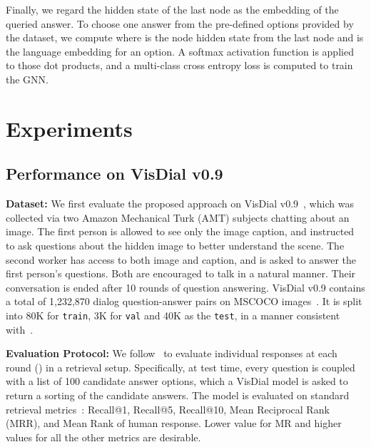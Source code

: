 \documentclass[10pt,twocolumn,letterpaper]{article}
\begin{document}
Finally, we regard the hidden state of the last node as the embedding of the queried answer. To choose one answer from the pre-defined options provided by the dataset, we compute  where  is the node hidden state from the last node and  is the language embedding for an option. A softmax activation function is applied to those dot products, and a multi-class cross entropy loss is computed to train the GNN.

\section{Experiments}\label{sec:ex}
\vspace{-3pt}
\subsection{Performance on VisDial v0.9~\cite{das2017visual}}\label{sec:vd}
\vspace{-3pt}
\noindent\textbf{Dataset:} We first evaluate the proposed approach on VisDial v0.9~\cite{das2017visual}, which was collected via two Amazon Mechanical Turk (AMT) subjects chatting about an image. The first person is allowed to see only the image caption, and instructed to ask questions about the hidden image to better understand the scene.  The second worker has access to both image and caption, and is asked to answer the first person's questions. Both are encouraged to talk in a natural manner. Their conversation is ended after 10 rounds of question answering. VisDial v0.9 contains a total of 1,232,870 dialog question-answer pairs on MSCOCO images~\cite{lin2014microsoft}. It is split into 80K for \verb"train", 3K  for \verb"val" and 40K as the \verb"test", in a manner consistent with~\cite{das2017visual}.

\noindent\textbf{Evaluation Protocol:} We follow~\cite{das2017visual} to evaluate individual responses at each round () in a retrieval setup. Specifically, at test time, every question is coupled with a list of 100 candidate answer options, which a VisDial model is asked to return a sorting of the candidate answers. The model is
evaluated on standard retrieval metrics~\cite{das2017visual}:  Recall@1, Recall@5, Recall@10, Mean Reciprocal Rank (MRR), and
Mean Rank of human response. Lower value for MR and higher values for all the other metrics are desirable.
\end{document}
